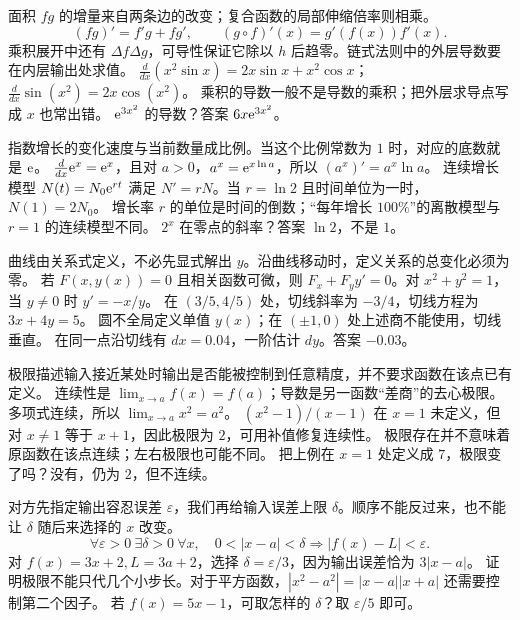 \idea 面积 $fg$ 的增量来自两条边的改变；复合函数的局部伸缩倍率则相乘。
\mathpart
\[(fg)'=f'g+fg',\qquad (g\circ f)'(x)=g'(f(x))f'(x).\]
乘积展开中还有 $\Delta f\Delta g$，可导性保证它除以 $h$ 后趋零。链式法则中的外层导数要在内层输出处求值。
\examplepart $\frac{d}{dx}(x^2\sin x)=2x\sin x+x^2\cos x$；$\frac{d}{dx}\sin(x^2)=2x\cos(x^2)$。
\pitfall 乘积的导数一般不是导数的乘积；把外层求导点写成 $x$ 也常出错。
\exercise $\mathrm e^{3x^2}$ 的导数？答案 $6x\mathrm e^{3x^2}$。
\nextlesson

\idea 指数增长的变化速度与当前数量成比例。当这个比例常数为 $1$ 时，对应的底数就是 $\mathrm e$。
\mathpart $\frac{d}{dx}\mathrm e^x=\mathrm e^x$，且对 $a>0$，$a^x=\mathrm e^{x\ln a}$，所以 $(a^x)'=a^x\ln a$。
\examplepart 连续增长模型 $N(t)=N_0\mathrm e^{rt}$ 满足 $N'=rN$。当 $r=\ln2$ 且时间单位为一时，$N(1)=2N_0$。
\pitfall 增长率 $r$ 的单位是时间的倒数；“每年增长 $100\%$”的离散模型与 $r=1$ 的连续模型不同。
\exercise $2^x$ 在零点的斜率？答案 $\ln2$，不是 $1$。
\nextlesson

\idea 曲线由关系式定义，不必先显式解出 $y$。沿曲线移动时，定义关系的总变化必须为零。
\mathpart 若 $F(x,y(x))=0$ 且相关函数可微，则 $F_x+F_y y'=0$。对 $x^2+y^2=1$，当 $y\ne0$ 时 $y'=-x/y$。
\examplepart 在 $(3/5,4/5)$ 处，切线斜率为 $-3/4$，切线方程为 $3x+4y=5$。
\pitfall 圆不全局定义单值 $y(x)$；在 $(\pm1,0)$ 处上述商不能使用，切线垂直。
\exercise 在同一点沿切线有 $dx=0.04$，一阶估计 $dy$。答案 $-0.03$。
\nextlesson

\idea 极限描述输入接近某处时输出是否能被控制到任意精度，并不要求函数在该点已有定义。
\mathpart 连续性是 $\lim_{x\to a}f(x)=f(a)$；导数是另一函数“差商”的去心极限。多项式连续，所以 $\lim_{x\to a}x^2=a^2$。
\examplepart $(x^2-1)/(x-1)$ 在 $x=1$ 未定义，但对 $x\ne1$ 等于 $x+1$，因此极限为 $2$，可用补值修复连续性。
\pitfall 极限存在并不意味着原函数在该点连续；左右极限也可能不同。
\exercise 把上例在 $x=1$ 处定义成 $7$，极限变了吗？没有，仍为 $2$，但不连续。
\nextlesson

\idea 对方先指定输出容忍误差 $\varepsilon$，我们再给输入误差上限 $\delta$。顺序不能反过来，也不能让 $\delta$ 随后来选择的 $x$ 改变。
\mathpart
\[\forall\varepsilon>0\ \exists\delta>0\ \forall x,
\quad 0<|x-a|<\delta\Rightarrow |f(x)-L|<\varepsilon.\]
\examplepart 对 $f(x)=3x+2,L=3a+2$，选择 $\delta=\varepsilon/3$，因为输出误差恰为 $3|x-a|$。
\pitfall 证明极限不能只代几个小步长。对于平方函数，$|x^2-a^2|=|x-a||x+a|$ 还需要控制第二个因子。
\exercise 若 $f(x)=5x-1$，可取怎样的 $\delta$？取 $\varepsilon/5$ 即可。
\nextlesson

